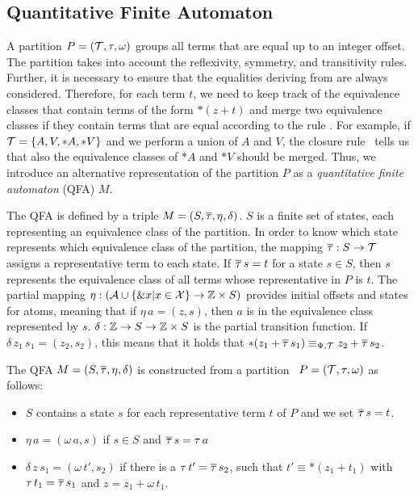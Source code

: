 \subsection{Quantitative Finite Automaton}\label{subsection:qfa}

A partition $P = (\mathcal{T}, \tau, \omega)$ groups all terms that are equal up to an integer offset.
The partition takes into account the reflexivity, symmetry, and transitivity rules.
Further, it is necessary to ensure that the equalities deriving from  are always considered.
Therefore, for each term $t$, we need to keep track of the equivalence classes that contain terms of the form $*(z+t)$ and merge two equivalence classes if they contain terms that are equal according to the rule .
For example, if $\mathcal{T} = \{A, V, *A, *V\}$ and we perform a union of $A$ and $V$, the closure rule~ tells us that also the equivalence classes of $*A$ and $*V$ should be merged.
Thus, we introduce an alternative representation of the partition $P$ as a \emph{quantitative finite automaton} (QFA) $M$.

The QFA is defined by a triple $M = (S, \overline{\tau}, \eta, \delta)$. $S$ is a finite set of states, each representing an equivalence class of the partition.
In order to know which state represents which equivalence class of the partition, the mapping $\overline{\tau} : S \rightarrow \mathcal{T}$ assigns a representative term to each state.
If $\overline{\tau}\,s = t$ for a state $s \in S$, then $s$ represents the equivalence class of all terms whose representative in $P$ is $t$.
The partial mapping $\eta : (\mathcal{A} \cup \{\&x | x \in \mathcal{X}\} \rightarrow \mathbb{Z} \times S)$ provides initial offsets and states for atoms, meaning that if $\eta\,a = (z,s)$, then $a$ is in the equivalence class represented by $s$.
$\delta : \mathbb{Z} \rightarrow S \rightarrow \mathbb{Z} \times S$ is the partial transition function.
If $\delta\,z_1\,s_1 = (z_2, s_2)$, this means that it holds that $*(z_1 + \overline{\tau}\,s_1) \equiv_{\Psi,\mathcal{T}} z_2 + \overline{\tau}\,s_2$.

The QFA $M = (S, \overline{\tau}, \eta, \delta)$ is constructed from a partition  $P = (\mathcal{T}, \tau, \omega)$ as follows:
\begin{itemize}
  \item $S$ contains a state $s$ for each representative term $t$ of $P$ and we set $\overline{\tau}\,s = t$.
  \item $\eta\,a = (\omega\,a, s)$ if $s \in S$ and $\overline{\tau}\,s = \tau\,a$
  \item $\delta\,z\,s_1 = (\omega\,t', s_2)$ if there is a $\tau\,t'=\overline{\tau}\,s_2$, such that $t' \equiv *(z_1 + t_1)$ with $\tau \,t_1= \overline{\tau}\,s_1$ and $z = z_1 + \omega\,t_1$.
\end{itemize}

